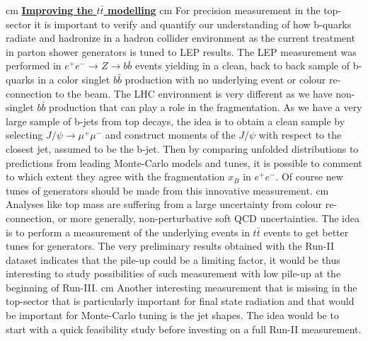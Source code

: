 \documentclass[12pt]{article}
\begin{document}
 cm
\noindent
\underline{\bf Improving the $t\bar{t}$ modelling}
 cm
\noindent
For precision measurement in the top-sector it is important to verify and quantify our understanding of how b-quarks radiate and hadronize in a hadron collider environment as the current treatment in parton shower generators is tuned to LEP results. The LEP measurement was performed in $e^+e^- \rightarrow Z \rightarrow b\bar{b}$ events yielding in a clean, back to back sample of b-quarks in a color singlet $b\bar{b}$ production with no underlying event or colour re-connection to the beam. The LHC environment is very different as we have non-singlet $b\bar{b}$ production that can play a role in the fragmentation. As we have a very large sample of b-jets from top decays, the idea is to obtain a clean sample by selecting $J\slash\psi \rightarrow \mu^+\mu^-$ and construct moments of the $J\slash\psi$ with respect to the closest jet, assumed to be the b-jet. Then by comparing unfolded distributions to predictions from leading Monte-Carlo models and tunes, it is possible to comment to which extent they agree with the fragmentation $x_B$ in $e^+e^-$. Of course new tunes of generators should be made from this innovative measurement.
 cm
\noindent
Analyses like top mass are suffering from a large uncertainty from colour re-connection, or more generally, non-perturbative soft QCD uncertainties. The idea is to perform a measurement of the underlying events in $t\bar{t}$ events to get better tunes for generators. The very preliminary results obtained with the Run-II dataset indicates that the pile-up could be a limiting factor, it would be thus interesting to study possibilities of such measurement with low pile-up at the beginning of Run-III.
 cm
\noindent
Another interesting measurement that is missing in the top-sector that is particularly important for final state radiation and that would be important for Monte-Carlo tuning is the jet shapes. The idea would be to start with a quick feasibility study before investing on a full Run-II measurement.
\end{document}
